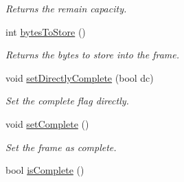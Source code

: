\begin{DoxyCompactItemize}
\begin{DoxyCompactList}\small\item\em Returns the remain capacity. \end{DoxyCompactList}\item 
int \hyperlink{classmdt_frame_a8526b227a56562fddf8445060e8095d4}{bytesToStore} ()
\begin{DoxyCompactList}\small\item\em Returns the bytes to store into the frame. \end{DoxyCompactList}\item 
void \hyperlink{classmdt_frame_abfd6de396626f01ebf972b7d6cd26957}{setDirectlyComplete} (bool dc)
\begin{DoxyCompactList}\small\item\em Set the complete flag directly. \end{DoxyCompactList}\item 
void \hyperlink{classmdt_frame_ab8db9882c095091109115afb8e448b37}{setComplete} ()
\begin{DoxyCompactList}\small\item\em Set the frame as complete. \end{DoxyCompactList}\item 
\hypertarget{classmdt_frame_a2a8fb9f36c941282881bba0c538d1ce5}{
bool \hyperlink{classmdt_frame_a2a8fb9f36c941282881bba0c538d1ce5}{isComplete} ()}
\label{classmdt_frame_a2a8fb9f36c941282881bba0c538d1ce5}


\end{DoxyCompactItemize}
